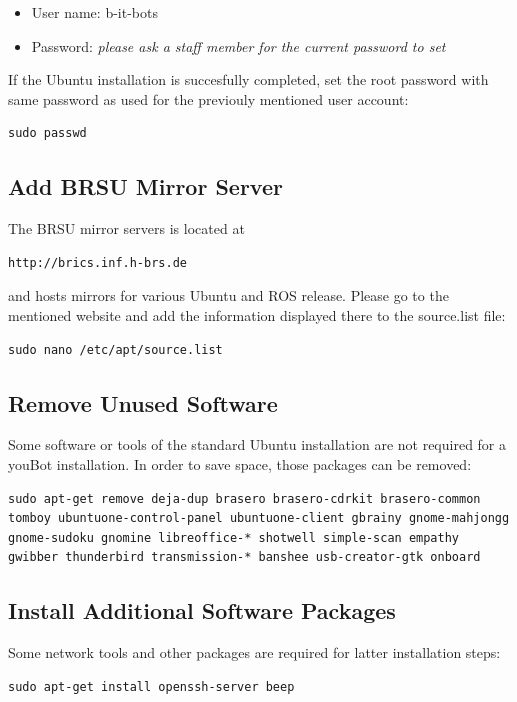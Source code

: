 \documentclass[a4paper,12pt]{article}
\begin{document}
\begin{itemize}
	\item User name: b-it-bots
	\item Password: \textit{please ask a staff member for the current password to set}
\end{itemize}

If the Ubuntu installation is succesfully completed, set the root password with same password as used for the previouly mentioned user account:
\begin{lstlisting}
sudo passwd
\end{lstlisting}



\subsection{Add BRSU Mirror Server}
The BRSU mirror servers is located at 
\begin{lstlisting}
http://brics.inf.h-brs.de
\end{lstlisting}
and hosts mirrors for various Ubuntu and ROS release. Please go to the mentioned website and add the information displayed there to the source.list file:
\begin{lstlisting}
sudo nano /etc/apt/source.list
\end{lstlisting}



\subsection{Remove Unused Software}
Some software or tools of the standard Ubuntu installation are not required for a youBot installation. In order to save space, those packages can be removed:
\begin{lstlisting}
sudo apt-get remove deja-dup brasero brasero-cdrkit brasero-common tomboy ubuntuone-control-panel ubuntuone-client gbrainy gnome-mahjongg gnome-sudoku gnomine libreoffice-* shotwell simple-scan empathy gwibber thunderbird transmission-* banshee usb-creator-gtk onboard
\end{lstlisting}



\subsection{Install Additional Software Packages}
Some network tools and other packages are required for latter installation steps:
\begin{lstlisting}
sudo apt-get install openssh-server beep
\end{lstlisting}
\end{document}
